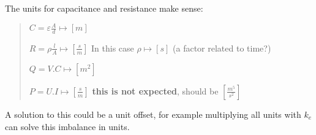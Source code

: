 \documentclass[]{article}
\begin{document}
The units for capacitance and resistance make sense:

\begin{quote}
\(C=\varepsilon \frac{A}{d} \mapsto [m]\)

\(R= \rho \frac{l}{A} \mapsto [\frac{s}{m}]\) In this case
\(\rho \mapsto [s]\) (a factor related to time?)

\(Q=V.C \mapsto [m^2]\)

\(P=U.I \mapsto [\frac{s}{m}]\) \textbf{this is not expected}, should be
\([\frac {m^5}{s^2}]\)
\end{quote}

A solution to this could be a unit offset, for example multiplying all
units with \(k_e\) can solve this imbalance in units.
\end{document}
